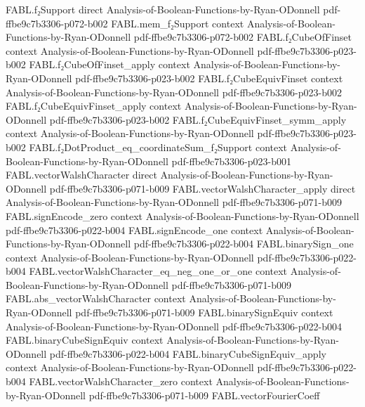 \begin{theorem}
  {FABL.f₂Support}
  {direct}
  {Analysis-of-Boolean-Functions-by-Ryan-ODonnell}
  {pdf-ffbe9c7b3306-p072-b002}
\proofstep
  {FABL.mem_f₂Support}
  {context}
  {Analysis-of-Boolean-Functions-by-Ryan-ODonnell}
  {pdf-ffbe9c7b3306-p072-b002}
\proofstep
  {FABL.f₂CubeOfFinset}
  {context}
  {Analysis-of-Boolean-Functions-by-Ryan-ODonnell}
  {pdf-ffbe9c7b3306-p023-b002}
\proofstep
  {FABL.f₂CubeOfFinset_apply}
  {context}
  {Analysis-of-Boolean-Functions-by-Ryan-ODonnell}
  {pdf-ffbe9c7b3306-p023-b002}
\proofstep
  {FABL.f₂CubeEquivFinset}
  {context}
  {Analysis-of-Boolean-Functions-by-Ryan-ODonnell}
  {pdf-ffbe9c7b3306-p023-b002}
\proofstep
  {FABL.f₂CubeEquivFinset_apply}
  {context}
  {Analysis-of-Boolean-Functions-by-Ryan-ODonnell}
  {pdf-ffbe9c7b3306-p023-b002}
\proofstep
  {FABL.f₂CubeEquivFinset_symm_apply}
  {context}
  {Analysis-of-Boolean-Functions-by-Ryan-ODonnell}
  {pdf-ffbe9c7b3306-p023-b002}
\proofstep
  {FABL.f₂DotProduct_eq_coordinateSum_f₂Support}
  {context}
  {Analysis-of-Boolean-Functions-by-Ryan-ODonnell}
  {pdf-ffbe9c7b3306-p023-b001}
\proofstep
  {FABL.vectorWalshCharacter}
  {direct}
  {Analysis-of-Boolean-Functions-by-Ryan-ODonnell}
  {pdf-ffbe9c7b3306-p071-b009}
\proofstep
  {FABL.vectorWalshCharacter_apply}
  {direct}
  {Analysis-of-Boolean-Functions-by-Ryan-ODonnell}
  {pdf-ffbe9c7b3306-p071-b009}
\proofstep
  {FABL.signEncode_zero}
  {context}
  {Analysis-of-Boolean-Functions-by-Ryan-ODonnell}
  {pdf-ffbe9c7b3306-p022-b004}
\proofstep
  {FABL.signEncode_one}
  {context}
  {Analysis-of-Boolean-Functions-by-Ryan-ODonnell}
  {pdf-ffbe9c7b3306-p022-b004}
\proofstep
  {FABL.binarySign_one}
  {context}
  {Analysis-of-Boolean-Functions-by-Ryan-ODonnell}
  {pdf-ffbe9c7b3306-p022-b004}
\proofstep
  {FABL.vectorWalshCharacter_eq_neg_one_or_one}
  {context}
  {Analysis-of-Boolean-Functions-by-Ryan-ODonnell}
  {pdf-ffbe9c7b3306-p071-b009}
\proofstep
  {FABL.abs_vectorWalshCharacter}
  {context}
  {Analysis-of-Boolean-Functions-by-Ryan-ODonnell}
  {pdf-ffbe9c7b3306-p071-b009}
\proofstep
  {FABL.binarySignEquiv}
  {context}
  {Analysis-of-Boolean-Functions-by-Ryan-ODonnell}
  {pdf-ffbe9c7b3306-p022-b004}
\proofstep
  {FABL.binaryCubeSignEquiv}
  {context}
  {Analysis-of-Boolean-Functions-by-Ryan-ODonnell}
  {pdf-ffbe9c7b3306-p022-b004}
\proofstep
  {FABL.binaryCubeSignEquiv_apply}
  {context}
  {Analysis-of-Boolean-Functions-by-Ryan-ODonnell}
  {pdf-ffbe9c7b3306-p022-b004}
\proofstep
  {FABL.vectorWalshCharacter_zero}
  {context}
  {Analysis-of-Boolean-Functions-by-Ryan-ODonnell}
  {pdf-ffbe9c7b3306-p071-b009}
\proofstep
  {FABL.vectorFourierCoeff}

\end{theorem}
